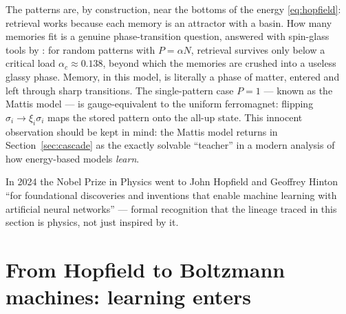 The patterns are, by construction, near the bottoms of the energy
\eqref{eq:hopfield}: retrieval works because each memory is an attractor
with a basin. How many memories fit is a genuine phase-transition question,
answered with spin-glass tools by
\citet{amit1985storing}: for random patterns with $P = \alpha N$, retrieval
survives only below a critical load $\alpha_c \approx 0.138$, beyond which
the memories are crushed into a useless glassy phase. Memory, in this model,
is literally a phase of matter, entered and left through sharp transitions.
The single-pattern case $P=1$ --- known as the Mattis model
\citep{mattis1976solvable} --- is gauge-equivalent to the uniform
ferromagnet: flipping $\sigma_i \to \xi_i \sigma_i$ maps the stored pattern
onto the all-up state. This innocent observation should be kept in mind: the
Mattis model returns in Section~\ref{sec:cascade} as the exactly solvable
``teacher'' in a modern analysis of how energy-based models \emph{learn}.

In 2024 the Nobel Prize in Physics went to John Hopfield and Geoffrey Hinton
``for foundational discoveries and inventions that enable machine learning
with artificial neural networks'' \citep{nobel2024physics} --- formal
recognition that the lineage traced in this section is physics, not just
inspired by it.

\section{From Hopfield to Boltzmann machines: learning enters}
\label{sec:boltzmann-machines}

